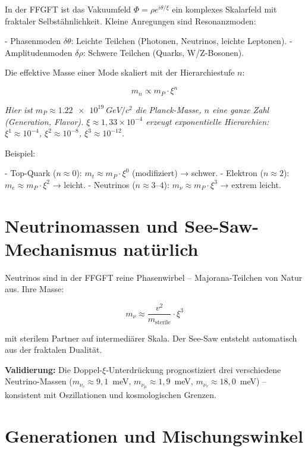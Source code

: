 	In der FFGFT ist das Vakuumfeld \(\Phi = \rho e^{i \theta / \xi}\) ein komplexes Skalarfeld mit fraktaler Selbstähnlichkeit. Kleine Anregungen sind Resonanzmoden:
	
	- Phasenmoden \(\delta \theta\): Leichte Teilchen (Photonen, Neutrinos, leichte Leptonen).
	- Amplitudenmoden \(\delta \rho\): Schwere Teilchen (Quarks, W/Z-Bosonen).
	
	Die effektive Masse einer Mode skaliert mit der Hierarchiestufe \(n\):
	
	\begin{equation}
		m_n \propto m_P \cdot \xi^n
	\end{equation}
	
	\textit{Hier ist \(m_P \approx \SI{1.22e19}{GeV/c^2}\) die Planck-Masse, \(n\) eine ganze Zahl (Generation, Flavor). \(\xi \approx 1{,}33 \times 10^{-4}\) erzeugt exponentielle Hierarchien: \(\xi^1 \approx 10^{-4}\), \(\xi^2 \approx 10^{-8}\), \(\xi^3 \approx 10^{-12}\).}
	
	Beispiel:
	
	- Top-Quark (\(n \approx 0\)): \(m_t \approx m_P \cdot \xi^0\) (modifiziert) → schwer.
	- Elektron (\(n \approx 2\)): \(m_e \approx m_P \cdot \xi^2\) → leicht.
	- Neutrinos (\(n \approx 3–4\)): \(m_\nu \approx m_P \cdot \xi^3\) → extrem leicht.
	
	\section{Neutrinomassen und See-Saw-Mechanismus natürlich}
	
	Neutrinos sind in der FFGFT reine Phasenwirbel – Majorana-Teilchen von Natur aus. Ihre Masse:
	
	\begin{equation}
		m_\nu \approx \frac{v^2}{m_{\text{sterile}}} \cdot \xi^3
	\end{equation}
	
	mit sterilem Partner auf intermediärer Skala. Der See-Saw entsteht automatisch aus der fraktalen Dualität.
	
	\textbf{Validierung:} Die Doppel-$\xi$-Unterdrückung prognostiziert drei verschiedene Neutrino-Massen ($m_{\nu_e} \approx 9{,}1$~meV, $m_{\nu_\mu} \approx 1{,}9$~meV, $m_{\nu_\tau} \approx 18{,}0$~meV) – konsistent mit Oszillationen und kosmologischen Grenzen.
	
	\section{Generationen und Mischungswinkel}
	
